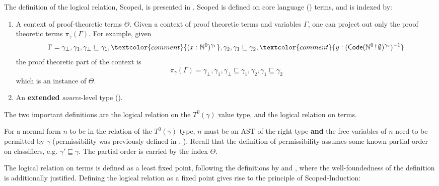The definition of the logical relation, \textsf{Scoped}, is presented in . \textsf{Scoped} is defined on core language (\coreLang{}) terms, and is indexed by:
\begin{enumerate}
  \item A context of proof-theoretic terms $\Theta$. Given a context of proof theoretic terms and variables $\Gamma$, one can project out only the proof theoretic terms $\pi_{\gamma}({\Gamma})$. For example, given 
  \[\Gamma = \gamma_\bot, \gamma_1, \gamma_\bot \sqsubseteq \gamma_1, \textcolor{comment}{(x:\mathbb{N}^0)^{\gamma_1}}, \gamma_2, \gamma_1 \sqsubseteq \gamma_2,  \textcolor{comment}{y:(\textsf{Code}(\mathbb{N}^0 \, ! \, \emptyset)^{\gamma_2})^{-1}}\]
  the proof theoretic part of the context is
  \[\pi_{\gamma}({\Gamma}) = \gamma_\bot, \gamma_1, \gamma_\bot \sqsubseteq \gamma_1, \gamma_2, \gamma_1 \sqsubseteq \gamma_2 \]
  which is an instance of $\Theta$.
  \item An \textbf{extended} \textit{source}-level type (). 
\end{enumerate}

The two important definitions are the logical relation on the $T^{0} (\gamma)$ value type, and the logical relation on terms. 

For a normal form $n$ to be in the relation of the $T^{0} (\gamma)$ type, $n$ must be an AST of the right type \textbf{and} the free variables of $n$ need to be permitted by $\gamma$ (permissibility was previously defined in , ). Recall that the definition of permissibility assumes some known partial order on classifiers, e.g. $\gamma' \sqsubseteq \gamma$. The partial order is carried by the index $\Theta$. 

The logical relation on terms is defined as a least fixed point, following the definitions by \citet{plotkin-2025} and \citet{kuchta-2023}, where the well-foundedness of the definition is additionally justified. Defining the logical relation as a fixed point gives rise to the principle of \textsf{Scoped}-Induction:

\newcommand{\scoped}[2][\Theta]{\textsf{Scoped}_{{#1}, {#2}}}

